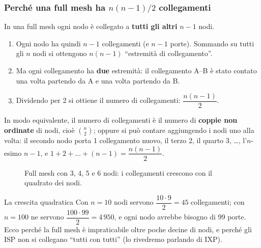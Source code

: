\subsubsection*{Perché una full mesh ha $n(n-1)/2$ collegamenti}

In una full mesh ogni nodo è collegato a \textbf{tutti gli altri} $n-1$ nodi.

\begin{enumerate}
    \item Ogni nodo ha quindi $n-1$ collegamenti (e $n-1$ porte). Sommando su tutti gli $n$ nodi
          si ottengono $n(n-1)$ ``estremità di collegamento''.
    \item Ma ogni collegamento ha \textbf{due} estremità: il collegamento A--B è stato contato una
          volta partendo da A e una volta partendo da B.
    \item Dividendo per 2 si ottiene il numero di collegamenti: $\dfrac{n(n-1)}{2}$.
\end{enumerate}

In modo equivalente, il numero di collegamenti è il numero di \textbf{coppie non ordinate} di nodi,
cioè $\binom{n}{2}$; oppure si può contare aggiungendo i nodi uno alla volta: il secondo nodo
porta 1 collegamento nuovo, il terzo 2, il quarto 3, \dots, l'$n$-esimo $n-1$, e
$1+2+\dots+(n-1) = \dfrac{n(n-1)}{2}$.

\begin{figure}[H]
\centering
{}
\caption{Full mesh con 3, 4, 5 e 6 nodi: i collegamenti crescono con il quadrato dei nodi.}
\end{figure}

\begin{esempio}{La crescita quadratica}
Con $n=10$ nodi servono $\dfrac{10\cdot 9}{2} = 45$ collegamenti; con $n=100$ ne servono
$\dfrac{100\cdot 99}{2} = 4\,950$, e ogni nodo avrebbe bisogno di 99 porte. Ecco perché la full mesh
è impraticabile oltre poche decine di nodi, e perché gli ISP non si collegano ``tutti con tutti''
(lo rivedremo parlando di IXP).
\end{esempio}


